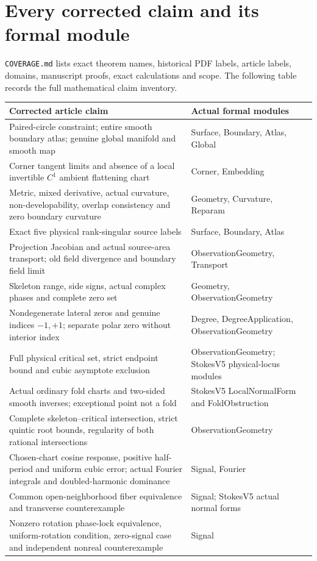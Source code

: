 \documentclass[11pt,a4paper]{article}
\begin{document}
\section{Every corrected claim and its formal module}
\texttt{COVERAGE.md} lists exact theorem names, historical PDF labels,
article labels, domains, manuscript proofs, exact calculations and scope.
The following table records the full mathematical claim inventory.
\small
\begin{longtable}{@{}p{.53\linewidth}p{.40\linewidth}@{}}
\toprule Corrected article claim & Actual formal modules\\\midrule\endhead
Paired-circle constraint; entire smooth boundary atlas; genuine global
manifold and smooth map & Surface, Boundary, Atlas, Global\\
Corner tangent limits and absence of a local invertible $C^1$ ambient
flattening chart & Corner, Embedding\\
Metric, mixed derivative, actual curvature, non-developability, overlap
consistency and zero boundary curvature & Geometry, Curvature, Reparam\\
Exact five physical rank-singular source labels & Surface, Boundary, Atlas\\
Projection Jacobian and actual source-area transport; old field divergence
and boundary field limit & ObservationGeometry, Transport\\
Skeleton range, side signs, actual complex phases and complete zero set &
Geometry, ObservationGeometry\\
Nondegenerate lateral zeros and genuine indices $-1,+1$; separate polar
zero without interior index & Degree, DegreeApplication, ObservationGeometry\\
Full physical critical set, strict endpoint bound and cubic asymptote
exclusion & ObservationGeometry; StokesV5 physical-locus modules\\
Actual ordinary fold charts and two-sided smooth inverses; exceptional
point not a fold & StokesV5 LocalNormalForm and FoldObstruction\\
Complete skeleton--critical intersection, strict quintic root bounds,
regularity of both rational intersections & ObservationGeometry\\
Chosen-chart cosine response, positive half-period and uniform cubic
error; actual Fourier integrals and doubled-harmonic dominance & Signal, Fourier\\
Common open-neighborhood fiber equivalence and transverse counterexample &
Signal; StokesV5 actual normal forms\\
Nonzero rotation phase-lock equivalence, uniform-rotation condition,
zero-signal case and independent nonreal counterexample & Signal\\
\bottomrule
\end{longtable}\normalsize
\end{document}
